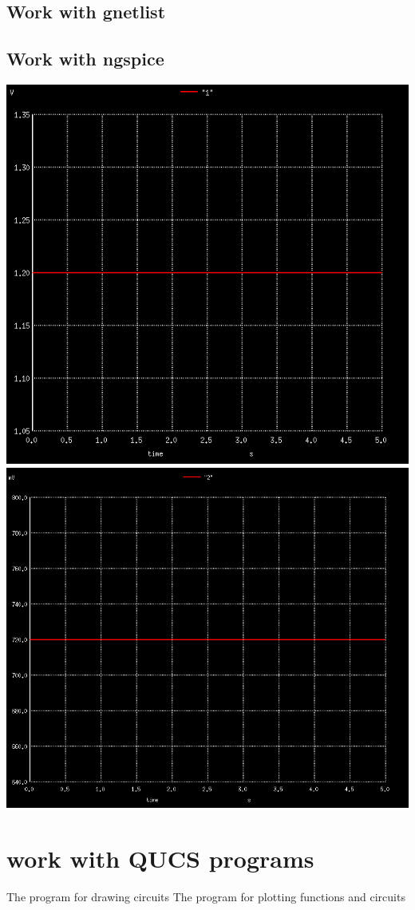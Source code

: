 \documentclass{report}
\begin{document}
\subsection{Work with gnetlist}

\subsection{Work with ngspice\cite{program2}}

\begin{center}
    \includegraphics[scale=0.4]{1.png}
    \includegraphics[scale=0.4]{2.png}
\end{center}

\section{work with QUCS programs}


\begin{thebibliography}{9}
The program for drawing circuits
The program for plotting functions and circuits
\end{thebibliography}
\end{document}

